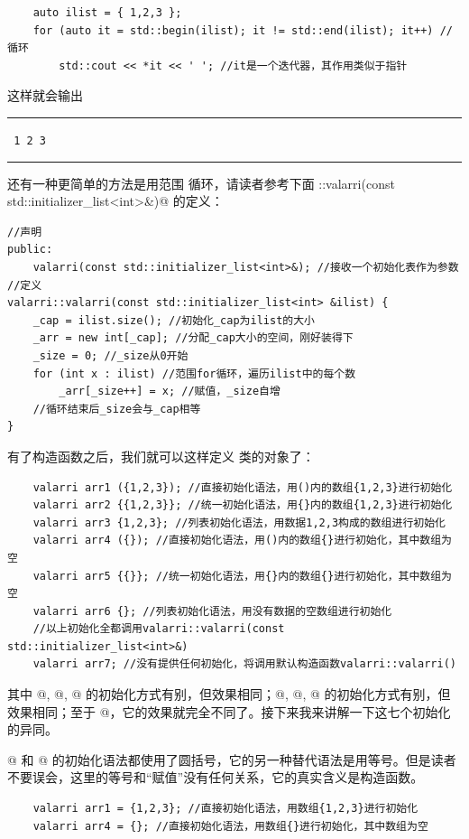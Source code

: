 \begin{lstlisting}
    auto ilist = { 1,2,3 };
    for (auto it = std::begin(ilist); it != std::end(ilist); it++) //循环
        std::cout << *it << ' '; //it是一个迭代器，其作用类似于指针
\end{lstlisting}
这样就会输出\\\noindent\rule{\linewidth}{.2pt}\texttt{
1 2 3 
}\\\noindent\rule{\linewidth}{.2pt}\par
还有一种更简单的方法是用范围 \lstinline@for@ 循环，请读者参考下面 \lstinline@valarri::valarri(const std::initializer_list<int>&)@ 的定义：
\begin{lstlisting}
//声明
public:
    valarri(const std::initializer_list<int>&); //接收一个初始化表作为参数
//定义
valarri::valarri(const std::initializer_list<int> &ilist) {
    _cap = ilist.size(); //初始化_cap为ilist的大小
    _arr = new int[_cap]; //分配_cap大小的空间，刚好装得下
    _size = 0; //_size从0开始
    for (int x : ilist) //范围for循环，遍历ilist中的每个数
        _arr[_size++] = x; //赋值，_size自增
    //循环结束后_size会与_cap相等
}
\end{lstlisting}\par
有了构造函数之后，我们就可以这样定义 \lstinline@valarri@ 类的对象了：
\begin{lstlisting}
    valarri arr1 ({1,2,3}); //直接初始化语法，用()内的数组{1,2,3}进行初始化
    valarri arr2 {{1,2,3}}; //统一初始化语法，用{}内的数组{1,2,3}进行初始化
    valarri arr3 {1,2,3}; //列表初始化语法，用数据1,2,3构成的数组进行初始化
    valarri arr4 ({}); //直接初始化语法，用()内的数组{}进行初始化，其中数组为空
    valarri arr5 {{}}; //统一初始化语法，用{}内的数组{}进行初始化，其中数组为空
    valarri arr6 {}; //列表初始化语法，用没有数据的空数组进行初始化
    //以上初始化全都调用valarri::valarri(const std::initializer_list<int>&)
    valarri arr7; //没有提供任何初始化，将调用默认构造函数valarri::valarri()
\end{lstlisting}
其中 @, @, @ 的初始化方式有别，但效果相同；@, @, @ 的初始化方式有别，但效果相同；至于 @，它的效果就完全不同了。接下来我来讲解一下这七个初始化的异同。\par
{}@ 和 @ 的初始化语法都使用了圆括号，它的另一种替代语法是用等号。但是读者不要误会，这里的等号和``赋值''没有任何关系，它的真实含义是构造函数。
\begin{lstlisting}
    valarri arr1 = {1,2,3}; //直接初始化语法，用数组{1,2,3}进行初始化
    valarri arr4 = {}; //直接初始化语法，用数组{}进行初始化，其中数组为空
\end{lstlisting}\par
